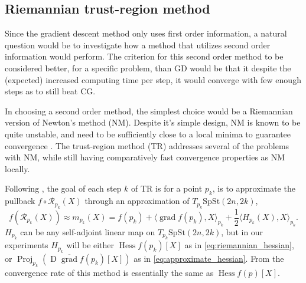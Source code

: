 \subsection{Riemannian trust-region method}
Since the gradient descent method only uses first order information, a natural question would be to investigate how a method that utilizes second order information would perform. The criterion for this second order method to be considered better, for a specific problem, than GD would be that it despite the (expected) increased computing time per step, it would converge with few enough steps as to still beat CG. 

In choosing a second order method, the simplest choice would be a Riemannian version of Newton's method (NM). Despite it's simple design, NM is known to be quite unstable, and need to be sufficiently close to a local minima to guarantee convergence \cite[p.~122]{Boumal2023}. The trust-region method (TR) addresses several of the problems with NM, while still having comparatively fast convergence properties as NM locally. 

Following \cite[p.~131]{Boumal2023}, the goal of each step $k$ of TR is for a point $p_{k}$, is to approximate the pullback $f\circ \mathcal{R}_{p_{k}}(X)$ through an approximation of $T_{p_{k}}\mathrm{SpSt}(2n, 2k)$,
%
\begin{equation*}
f(\mathcal{R}_{p_{k}}(X))\approx m_{p_{k}}(X)=f(p_{k})+\langle \operatorname{grad}f(p_{k}),X \rangle _{p_{k}}+ \frac{1}{2}\langle H_{p_{k}}(X),X \rangle _{p_{k}}.
\end{equation*}
%
$H_{p_{k}}$ can be any self-adjoint linear map on $T_{p_{k}}\mathrm{SpSt}(2n, 2k)$, but in our experiments $H_{p_{k}}$ will be either $\operatorname{Hess}f(p_{k})[X]$ as in \eqref{eq:riemannian_hessian}, or $\operatorname{Proj}_{p_{k}}(\operatorname{D}\overline{\operatorname{grad}}f(p_{k})[X])$ as in \eqref{eq:approximate_hessian}. From \cite[Prop.~5.44]{Boumal2023} the convergence rate of this method is essentially the same as $\operatorname{Hess}f(p)[X]$. 

